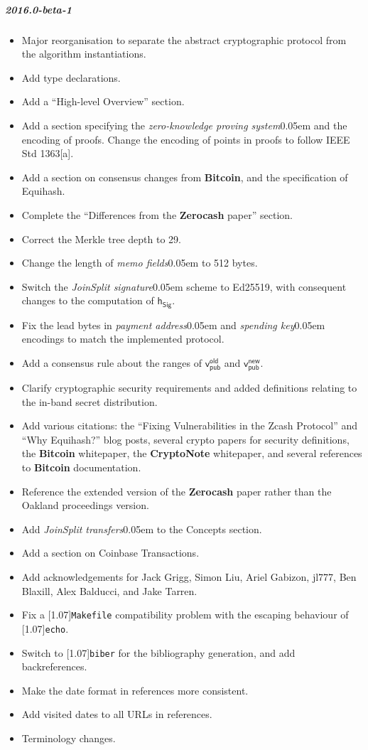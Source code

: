 \documentclass{article}
\let\oldtexttt\texttt
\renewcommand{\texttt}[1]{\scalebox{1.02}[1.07]{\oldtexttt{#1}}}
\newcommand{\introlist}{\needspace{15ex}}
\newcommand{\term}[1]{\textsl{#1}\kern 0.05em\xspace}
\newcommand{\termbf}[1]{\textbf{#1}\xspace}
\newcommand{\Zerocash}{\termbf{Zerocash}}
\newcommand{\Bitcoin}{\termbf{Bitcoin}}
\newcommand{\CryptoNote}{\termbf{CryptoNote}}
\newcommand{\joinSplitTransfers}{\term{JoinSplit transfers}}
\newcommand{\joinSplitSignature}{\term{JoinSplit signature}}
\newcommand{\zeroKnowledgeProvingSystem}{\term{zero-knowledge proving system}}
\newcommand{\paymentAddress}{\term{payment address}}
\newcommand{\spendingKey}{\term{spending key}}
\newcommand{\memos}{\term{memo fields}}
\newcommand{\hSig}{\mathsf{h_{Sig}}}
\newcommand{\vpubOld}{\mathsf{v_{pub}^{old}}}
\newcommand{\vpubNew}{\mathsf{v_{pub}^{new}}}
\begin{document}
\introlist
\subparagraph{2016.0-beta-1}

\begin{itemize}
    \item Major reorganisation to separate the abstract cryptographic protocol
          from the algorithm instantiations.
    \item Add type declarations.
    \item Add a ``High-level Overview'' section.
    \item Add a section specifying the \zeroKnowledgeProvingSystem and the
          encoding of proofs. Change the encoding of points in proofs to follow
          IEEE Std 1363[a].
    \item Add a section on consensus changes from \Bitcoin, and the specification
          of Equihash.
    \item Complete the ``Differences from the \Zerocash paper'' section.
    \item Correct the Merkle tree depth to 29.
    \item Change the length of \memos to 512 bytes.
    \item Switch the \joinSplitSignature scheme to Ed25519, with consequent
          changes to the computation of $\hSig$.
    \item Fix the lead bytes in \paymentAddress and \spendingKey encodings to
          match the implemented protocol.
    \item Add a consensus rule about the ranges of $\vpubOld$ and $\vpubNew$.
    \item Clarify cryptographic security requirements and added definitions
          relating to the in-band secret distribution.
    \item Add various citations: the ``Fixing Vulnerabilities in the Zcash
          Protocol'' and ``Why Equihash?'' blog posts, several crypto papers
          for security definitions, the \Bitcoin whitepaper, the \CryptoNote
          whitepaper, and several references to \Bitcoin documentation.
    \item Reference the extended version of the \Zerocash paper rather than the
          Oakland proceedings version.
    \item Add \joinSplitTransfers to the Concepts section.
    \item Add a section on Coinbase Transactions.
    \item Add acknowledgements for Jack Grigg, Simon Liu, Ariel Gabizon, jl777,
          Ben Blaxill, Alex Balducci, and Jake Tarren.
    \item Fix a \texttt{Makefile} compatibility problem with the escaping behaviour
          of \texttt{echo}.
    \item Switch to \texttt{biber} for the bibliography generation, and add
          backreferences.
    \item Make the date format in references more consistent.
    \item Add visited dates to all URLs in references.
    \item Terminology changes.
\end{itemize}
\end{document}
